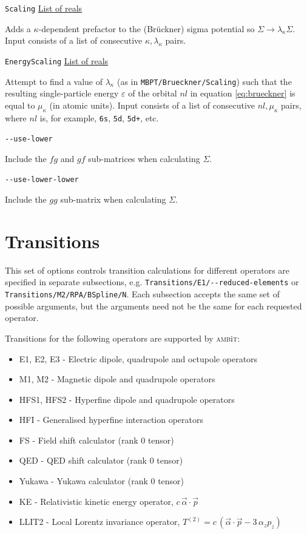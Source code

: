 \documentclass{report}
\newcommand{\ambit}{\textsc{amb}{\footnotesize i}\textsc{t}}
\begin{document}
\texttt{Scaling} \uline{List of reals}
\begin{adjustwidth}{1cm}{}
Adds a $\kappa$-dependent prefactor to the (Br\"{u}ckner) sigma potential so $\Sigma \to
\lambda_{\kappa}\Sigma$. Input consists of a list of consecutive $\kappa, \lambda_{\kappa}$ pairs.
\end{adjustwidth}

\texttt{EnergyScaling} \uline{List of reals}
\begin{adjustwidth}{1cm}{}
Attempt to find a value of $\lambda_{\kappa}$ (as in \texttt{MBPT/Brueckner/Scaling}) such that the resulting
single-particle energy $\varepsilon$ of the orbital $nl$ in equation \ref{eq:brueckner} is equal to $\mu_{\kappa}$ (in
atomic units). Input consists of a list of consecutive
$nl, \mu_{\kappa}$ pairs, where $nl$ is, for example, \texttt{6s}, \texttt{5d}, \texttt{5d+}, etc.
\end{adjustwidth}

\texttt{{-}{-}use-lower}
\begin{adjustwidth}{1cm}{}
Include the $fg$ and $gf$ sub-matrices when calculating $\Sigma$.
\end{adjustwidth}

\texttt{{-}{-}use-lower-lower}
\begin{adjustwidth}{1cm}{}
Include the $gg$ sub-matrix when calculating $\Sigma$.
\end{adjustwidth}

\section{Transitions}

This set of options controls transition calculations for different operators are specified in separate 
subsections, e.g. \texttt{Transitions/E1/{-}{-}reduced-elements} or 
\texttt{Transitions/M2/RPA/BSpline/N}. Each subsection accepts the same set 
of possible arguments, but the arguments need not be the same for each requested operator. 

Transitions for the following operators are supported by \ambit:

\begin{itemize}
\item E1, E2, E3 - Electric dipole, quadrupole and octupole operators
\item M1, M2 - Magnetic dipole and quadrupole operators
\item HFS1, HFS2 - Hyperfine dipole and quadrupole operators
\item HFI - Generalised hyperfine interaction operators
\item FS - Field shift calculator (rank 0 tensor)
\item QED - QED shift calculator (rank 0 tensor)
\item Yukawa - Yukawa calculator (rank 0 tensor)
\item KE - Relativistic kinetic energy operator, $c\,\vec{\alpha}\cdot\vec{p}$
\item LLIT2 - Local Lorentz invariance operator, $T^{(2)} = c\,(\vec{\alpha}\cdot\vec{p} - 3\,\alpha_z p_z)$
\end{itemize}
\end{document}
